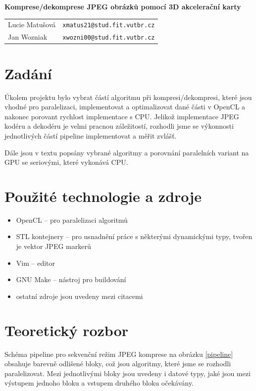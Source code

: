 \documentclass[a4paper,11pt]{article}
\begin{document}
\begin{center}{\LARGE\textbf{Komprese/dekomprese JPEG obrázků pomocí 3D akcelerační karty}}\\[0.2cm]
\newcommand{\autor}[2]{#1&\texttt{#2@stud.fit.vutbr.cz}\tabularnewline}
\begin{tabular}{ll}
    \autor{Lucie Matušová}{xmatus21}
    \autor{Jan Wozniak}{xwozni00}
\end{tabular}
\end{center}


\section{Zadání}
Úkolem projektu bylo vybrat částí algoritmu při kompresi/dekompresi, které jsou vhodné pro paralelizaci, implementovat
a optimalizovat dané části v OpenCL a nakonec porovant rychlost implementace s CPU. Jelikož implementace JPEG kodéru a
dekodéru je velmi pracnou záležitostí\cite{t81}, rozhodli jsme se výkonnosti jednotlivých částí pipeline implementovat
a měřit zvlášť.

Dále jsou v textu popsány vybrané algoritmy a porovnání paralelních variant na GPU se seriovými, které vykonává CPU.

\section{Použité technologie a zdroje}
\begin{itemize}
\item OpenCL -- pro paralelizaci algoritmů
\item STL kontejnery -- pro usnadnění práce s některými dynamickými typy, tvořen je vektor JPEG markerů
\item Vim -- editor
\item GNU Make -- nástroj pro buildování
\item ostatní zdroje jsou uvedeny mezi citacemi
\end{itemize}

\section{Teoretický rozbor} %
Schéma pipeline pro sekvenční režim JPEG komprese na obrázku \ref{pipeline} obsahuje barevně odlišené bloky, což jsou algoritmy,
které jsme se rozhodli paralelizovat. Mezi jednotlivými bloky jsou uvedeny i datové typy, jaké jsou mezi výstupem
jednoho bloku a vstupem druhého bloku očekávány.
\end{document}
